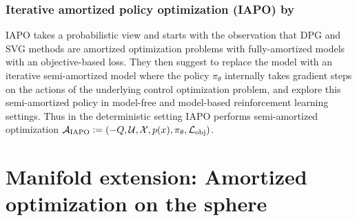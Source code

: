 \documentclass[twoside,11pt]{article}
\begin{document}
\subsubsection{Iterative amortized policy optimization (IAPO) by \citet{marino2020iterative}}
IAPO takes a probabilistic view and
starts with the observation that DPG and SVG methods
are amortized optimization problems with fully-amortized
models with an objective-based loss.
They then suggest to replace the model with an iterative
semi-amortized model where the policy $\pi_\theta$ internally
takes gradient steps on the actions of the underlying
control optimization problem, and explore this
semi-amortized policy in model-free and model-based
reinforcement learning settings.
Thus in the deterministic setting IAPO performs semi-amortized
optimization
${\mathcal{A}}_{\rm IAPO}\vcentcolon= (-Q, {\mathcal{U}}, {\mathcal{X}}, p(x), \pi_\theta, {\mathcal{L}}_{\rm obj})$.

\section{Manifold extension: Amortized optimization on the sphere}
\label{sec:apps:sphere}
\end{document}

